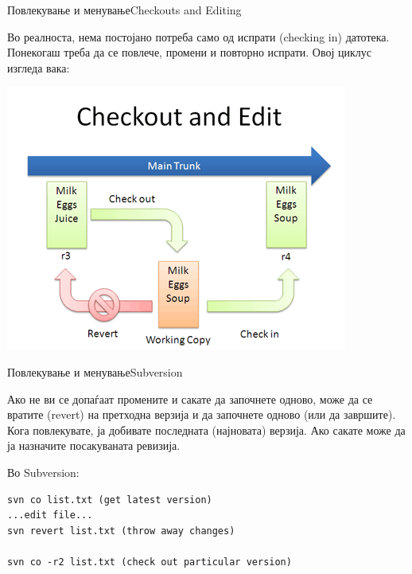     
\begin{frame}{Повлекување и менување}{Checkouts and Editing}
\begin{scriptsize}
Во реалноста, нема постојано потреба само од испрати (checking in) датотека.
Понекогаш треба да се повлече, промени и повторно испрати. Овој циклус изгледа
вака:
\end{scriptsize}
\begin{center}
    \includegraphics[scale=0.4]{images/checkout_edit.png}
\end{center}
\end{frame}

\begin{frame}[fragile]{Повлекување и менување}{Subversion}
\begin{scriptsize}
Ако не ви се допаѓаат промените и сакате да започнете одново, може да се вратите
(revert) на претходна верзија и да започнете одново (или да завршите). Кога
повлекувате, ја добивате последната (најновата) верзија. Ако сакате може да
ја назначите посакуваната ревизија.
\end{scriptsize}
\begin{exampleblock}{Во Subversion:}
\begin{verbatim}
svn co list.txt (get latest version)
...edit file...
svn revert list.txt (throw away changes)

svn co -r2 list.txt (check out particular version)
\end{verbatim}
\end{exampleblock}
\end{frame}


